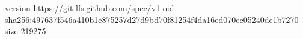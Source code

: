 version https://git-lfs.github.com/spec/v1
oid sha256:497637f546a410b1e875257d27d9bd70f81254f4da16ed070ec05240de1b7270
size 219275
